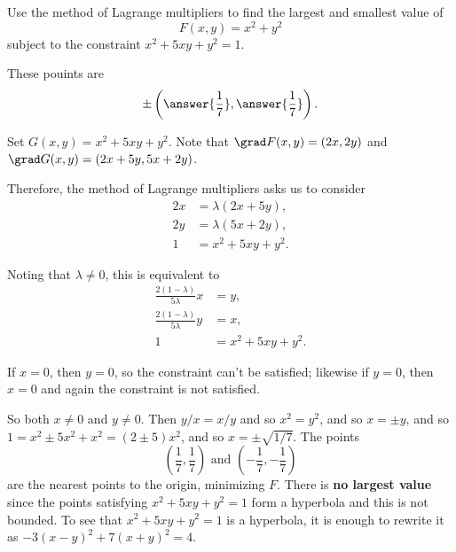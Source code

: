 \documentclass{ximera}
\author{Jim Fowler}
\begin{document}
\begin{exercise}
  Use the method of Lagrange multipliers to find the largest and
  smallest value of
  $$
  F(x,y) = x^2 + y^2
  $$
  subject to the constraint $x^2 + 5 xy + y^2 = 1$.

  These pouints are
  \[
    \pm \left( \answer{\frac{1}{7}}, \answer{\frac{1}{7}} \right).
  \]
  
  \begin{hint}
Set $G(x,y) = x^2 + 5xy + y^2$.  Note that $\grad F(x,y) = (2x,2y)$ and $\grad G(x,y) = (2x + 5y, 5x + 2y)$.
\end{hint}

  \begin{hint}
Therefore, the method of Lagrange multipliers asks us to consider
\begin{align*}
  2x &= \lambda( 2x + 5y ), \\
  2y &= \lambda( 5x + 2y ), \\
  1 &= x^2 + 5xy + y^2.
\end{align*}
\end{hint}

\begin{hint}
Noting that $\lambda \neq 0$, this is equivalent to
\begin{align*}
  \frac{2 (1 - \lambda)}{5 \lambda} x &= y, \\
  \frac{2 (1 - \lambda)}{5 \lambda} y &= x, \\
  1 &= x^2 + 5xy + y^2.
\end{align*}
\end{hint}

\begin{hint}
  If $x = 0$, then $y = 0$, so the constraint can't be satisfied; likewise if $y = 0$, then $x = 0$ and again the constraint is not satisfied.
\end{hint}

\begin{hint}
  So both $x \neq 0$ and $y \neq 0$.   Then $y/x = x/y$ and so $x^2 = y^2$, and so $x = \pm y$, and so $1 = x^2 \pm 5x^2 + x^2 = (2 \pm 5) x^2$, and so $x = \pm \sqrt{1/7}$.  The points
$$
\left( \frac{1}{7}, \frac{1}{7} \right) \mbox{ and } \left( -\frac{1}{7}, -\frac{1}{7} \right)
$$
are the nearest points to the origin, minimizing $F$.  There is \textbf{no largest value} since the points satisfying $x^2 + 5 xy + y^2 = 1$ form a hyperbola and this is not bounded.  To see that $x^2 + 5xy + y^2 = 1$ is a hyperbola, it is enough to rewrite it as $-3 (x-y)^2 + 7 (x+y)^2 = 4$.
\end{hint}


\end{exercise}
\end{document}
